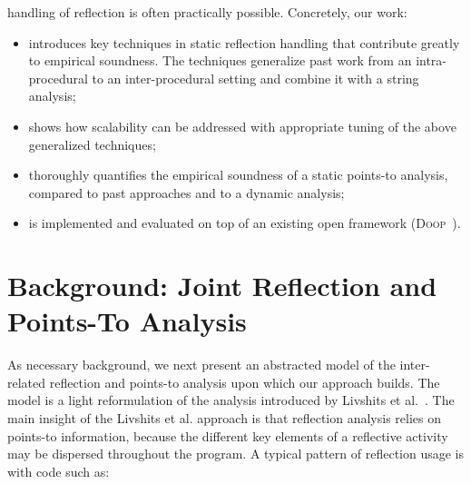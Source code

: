 handling of reflection is often practically possible. Concretely, our
work:
\begin{itemize}[\(\cdot\)]
\item introduces key techniques in static reflection handling that
  contribute greatly to empirical soundness. The techniques generalize
  past work from an intra-procedural to an inter-procedural setting
  and combine it with a string analysis;
\item shows how scalability can be addressed with appropriate tuning
  of the above generalized techniques;
\item thoroughly quantifies the empirical soundness of a static
  points-to analysis, compared to past approaches and to a dynamic
  analysis;
\item is implemented and evaluated on top of an existing open
  framework (\textsc{Doop}~\cite{oopsla/BravenboerS09}).
\end{itemize}



\section{Background: Joint Reflection and Points-To Analysis}
\label{sec:model}

As necessary background, we next present an abstracted model of the
inter-related reflection and points-to analysis upon which our
approach builds. The model is a light reformulation of the analysis
introduced by Livshits et
al.~\cite{aplas/LivshitsWL05,livshits:thesis}.  The main insight of
the Livshits et al. approach is that reflection analysis relies on
points-to information, because the different key elements of a
reflective activity may be dispersed throughout the program. A typical
pattern of reflection usage is with code such as:

